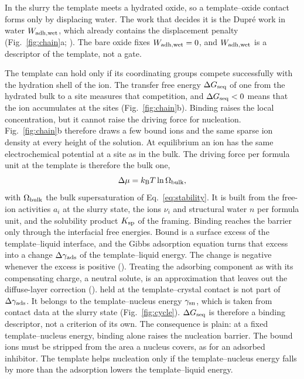 In the slurry the template meets a hydrated oxide, so a template--oxide contact forms only by displacing water. %
The work that decides it is the Dupr\'e work in water $W_\mathrm{adh,wet}$, which already contains the displacement penalty (Fig.~\ref{fig:chain}a; ). %
The bare oxide fixes $W_\mathrm{adh,wet}=0$, and $W_\mathrm{adh,wet}$ is a descriptor of the template, not a gate. %

The template can hold  only if its coordinating groups compete successfully with the hydration shell of the ion. %
The transfer free energy $\Delta G_\mathrm{seq}$ of one  from the hydrated bulk to a site measures that competition, and $\Delta G_\mathrm{seq}<0$ means that the ion accumulates at the sites (Fig.~\ref{fig:chain}b). %
Binding raises the local  concentration, but it cannot raise the driving force for nucleation. %
Fig.~\ref{fig:chain}b therefore draws a few bound ions and the same sparse ion density at every height of the solution. %
At equilibrium an ion has the same electrochemical potential at a site as in the bulk. %
The driving force per formula unit at the template is therefore the bulk one, %
\begin{equation}\label{eq:dmu}
\Delta\mu=k_\mathrm{B} T\ln\Omega_\mathrm{bulk},
\end{equation}
with $\Omega_\mathrm{bulk}$ the bulk supersaturation of Eq.~\eqref{eq:stability}. %
It is built from the free-ion activities $a_i$ at the slurry state, the ions $\nu_i$ and structural water $n$ per formula unit, and the solubility product $K_\mathrm{sp}$ of the framing. %
Binding reaches the barrier only through the interfacial free energies. %
Bound  is a surface excess of the template--liquid interface, and the Gibbs adsorption equation turns that excess into a change $\Delta\gamma_\mathrm{ads}$ of the template--liquid energy. %
The change is negative whenever the excess is positive (). %
Treating the adsorbing component as  with its compensating charge, a neutral solute, is an approximation that leaves out the diffuse-layer correction (). %
 held at the template--crystal contact is not part of $\Delta\gamma_\mathrm{ads}$. %
It belongs to the template--nucleus energy $\gamma_\mathrm{sn}$, which is taken from contact data at the slurry state (Fig.~\ref{fig:cycle}). %
$\Delta G_\mathrm{seq}$ is therefore a binding descriptor, not a criterion of its own. %
The consequence is plain: at a fixed template--nucleus energy, binding alone raises the nucleation barrier. %
The bound ions must be stripped from the area a nucleus covers, as for an adsorbed inhibitor. %
The template helps nucleation only if the template--nucleus energy falls by more than the adsorption lowers the template--liquid energy. %

